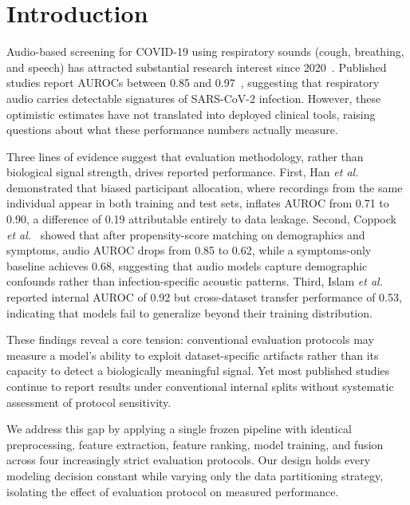 \documentclass[conference]{IEEEtran}
\begin{document}
\section{Introduction}
\label{sec:intro}

Audio-based screening for COVID-19 using respiratory sounds (cough, breathing, and speech) has attracted substantial research interest since 2020~\cite{pahar2022}. Published studies report AUROCs between 0.85 and 0.97~\cite{bhattacharya2023, chetupalli2023, aytekin2024}, suggesting that respiratory audio carries detectable signatures of SARS-CoV-2 infection. However, these optimistic estimates have not translated into deployed clinical tools, raising questions about what these performance numbers actually measure.

Three lines of evidence suggest that evaluation methodology, rather than biological signal strength, drives reported performance. First, Han \emph{et al.}~\cite{han2022} demonstrated that biased participant allocation, where recordings from the same individual appear in both training and test sets, inflates AUROC from 0.71 to 0.90, a difference of 0.19 attributable entirely to data leakage. Second, Coppock \emph{et al.}~\cite{coppock2024} showed that after propensity-score matching on demographics and symptoms, audio AUROC drops from 0.85 to 0.62, while a symptoms-only baseline achieves 0.68, suggesting that audio models capture demographic confounds rather than infection-specific acoustic patterns. Third, Islam \emph{et al.}~\cite{islam2026} reported internal AUROC of 0.92 but cross-dataset transfer performance of 0.53, indicating that models fail to generalize beyond their training distribution.

These findings reveal a core tension: conventional evaluation protocols may measure a model's ability to exploit dataset-specific artifacts rather than its capacity to detect a biologically meaningful signal. Yet most published studies continue to report results under conventional internal splits without systematic assessment of protocol sensitivity.

We address this gap by applying a single frozen pipeline with identical preprocessing, feature extraction, feature ranking, model training, and fusion across four increasingly strict evaluation protocols. Our design holds every modeling decision constant while varying only the data partitioning strategy, isolating the effect of evaluation protocol on measured performance.
\end{document}
